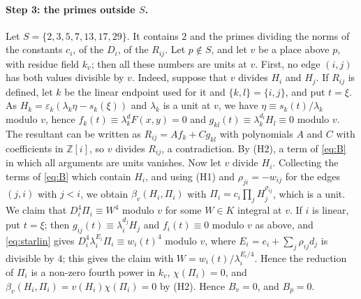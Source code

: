 \documentclass[11pt]{article}
\newcommand{\Z}{\mathbb{Z}}
\begin{document}
\paragraph{Step 3: the primes outside $S$.} Let $S=\{2,3,5,7,13,17,29\}$. It contains $2$ and the primes dividing the norms of the constants $c_i$, of the $D_i$, of the $R_{ij}$. Let $p\notin S$, and let $v$ be a place above $p$, with residue field $k_v$; then all these numbers are units at $v$. First, no edge $(i,j)$ has both values divisible by $v$. Indeed, suppose that $v$ divides $H_i$ and $H_j$. If $R_{ij}$ is defined, let $k$ be the linear endpoint used for it and $\{k,l\}=\{i,j\}$, and put $t=\xi$. As $H_k=\varepsilon_k(\lambda_k\eta-s_k(\xi))$ and $\lambda_k$ is a unit at $v$, we have $\eta\equiv s_k(t)/\lambda_k$ modulo $v$, hence $f_k(t)\equiv\lambda_k^dF(x,y)=0$ and $g_{kl}(t)\equiv\lambda_k^{d_l}H_l\equiv0$ modulo $v$. The resultant can be written as $R_{ij}=Af_k+Cg_{kl}$ with polynomials $A$ and $C$ with coefficients in $\Z[i]$, so $v$ divides $R_{ij}$, a contradiction. By (H2), a term of \eqref{eq:B} in which all arguments are units vanishes. Now let $v$ divide $H_i$. Collecting the terms of \eqref{eq:B} which contain $H_i$, and using (H1) and $\rho_{ji}=-w_{ij}$ for the edges $(j,i)$ with $j<i$, we obtain $\beta_v(H_i,\Pi_i)$ with $\Pi_i=c_i\prod_jH_j^{\rho_{ij}}$, which is a unit. We claim that $D_i^4\Pi_i\equiv W^4$ modulo $v$ for some $W\in K$ integral at $v$. If $i$ is linear, put $t=\xi$; then $g_{ij}(t)\equiv\lambda_i^{d_j}H_j$ and $f_i(t)\equiv0$ modulo $v$ as above, and \eqref{eq:starlin} gives $D_i^4\lambda_i^{E_i}\Pi_i\equiv w_i(t)^4$ modulo $v$, where $E_i=e_i+\sum_j\rho_{ij}d_j$ is divisible by $4$; this gives the claim with $W=w_i(t)/\lambda_i^{E_i/4}$. Hence the reduction of $\Pi_i$ is a non-zero fourth power in $k_v$, $\chi(\Pi_i)=0$, and $\beta_v(H_i,\Pi_i)=v(H_i)\chi(\Pi_i)=0$ by (H2). Hence $B_v=0$, and $B_p=0$.
\end{document}
